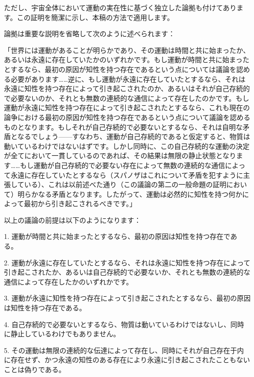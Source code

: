 \documentclass[a4paper,11pt,openany]{ltjsbook}
\begin{document}
ただし、宇宙全体において運動の実在性に基づく独立した論拠も付けてあります。この証明を簡潔に示し、本稿の方法で適用します。

論拠は重要な説明を省略して次のように述べられます：

「世界には運動があることが明らかであり、その運動は時間と共に始まったか、あるいは永遠に存在していたかのいずれかです。もし運動が時間と共に始まったとするなら、最初の原因が知性を持つ存在であるという点については議論を認める必要があります……逆に、もし運動が永遠に存在していたとするなら、それは永遠に知性を持つ存在によって引き起こされたのか、あるいはそれが自己存続的で必要ないのか、それとも無数の連続的な通信によって存在したのかです。もし運動が永遠に知性を持つ存在によって引き起こされたとするなら、これも現在の論争における最初の原因が知性を持つ存在であるという点について議論を認めるものとなります。もしそれが自己存続的で必要ないとするなら、それは自明な矛盾となるでしょう——すなわち、運動が自己存続的であると仮定すると、物質は動いているわけではないはずです。しかし同時に、この自己存続的な運動の決定が全てにおいて一貫しているのであれば、その結果は無限の静止状態となります……もし運動が自己存続的で必要ない存在によって無数の連続的な通信によって永遠に存在していたとするなら（スパノザはこれについて矛盾を犯すように主張している）、これは以前述べた通り（この議論の第二の一般命題の証明において）明らかなる矛盾となります。したがって、運動は必然的に知性を持つ何かによって最初から引き起こされるべきです。」

以上の議論の前提は以下のようになります：

1. 運動が時間と共に始まったとするなら、最初の原因は知性を持つ存在である。

2. 運動が永遠に存在していたとするなら、それは永遠に知性を持つ存在によって引き起こされたか、あるいは自己存続的で必要ないか、それとも無数の連続的な通信によって存在したかのいずれかです。

3. 運動が永遠に知性を持つ存在によって引き起こされたとするなら、最初の原因は知性を持つ存在である。

4. 自己存続的で必要ないとするなら、物質は動いているわけではないし、同時に静止しているわけでもありません。

5. その運動は無限の連続的な伝達によって存在し、同時にそれが自己存在于内に存在せず、かつ永遠の知性のある存在により永遠に引き起こされたこともないことは偽りである。
\end{document}
